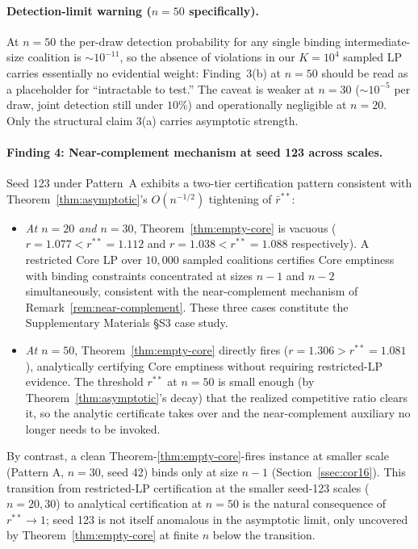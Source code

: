 \documentclass[11pt]{article}
\theoremstyle{plain}
\theoremstyle{definition}
\theoremstyle{remark}
\begin{document}
\paragraph{Detection-limit warning ($n=50$ specifically).} At $n=50$ the per-draw detection probability for any single binding intermediate-size coalition is $\sim 10^{-11}$, so the absence of violations in our $K=10^{4}$ sampled LP carries essentially no evidential weight: Finding~3(b) at $n=50$ should be read as a placeholder for ``intractable to test.'' The caveat is weaker at $n=30$ ($\sim 10^{-5}$ per draw, joint detection still under $10\%$) and operationally negligible at $n=20$. Only the structural claim 3(a) carries asymptotic strength.

\paragraph{Finding 4: Near-complement mechanism at seed 123 across scales.} Seed 123 under Pattern~A exhibits a two-tier certification pattern consistent with Theorem~\ref{thm:asymptotic}'s $O(n^{-1/2})$ tightening of $\bar r^{\ast\ast}$:
\begin{itemize}
  \item \emph{At $n=20$ and $n=30$}, Theorem~\ref{thm:empty-core} is vacuous ($r=1.077<r^{\ast\ast}=1.112$ and $r=1.038<r^{\ast\ast}=1.088$ respectively). A restricted Core LP over $10{,}000$ sampled coalitions certifies Core emptiness with binding constraints concentrated at sizes $n-1$ and $n-2$ simultaneously, consistent with the near-complement mechanism of Remark~\ref{rem:near-complement}. These three cases constitute the Supplementary Materials \S S3 case study.
  \item \emph{At $n=50$}, Theorem~\ref{thm:empty-core} directly fires ($r=1.306>r^{\ast\ast}=1.081$), analytically certifying Core emptiness without requiring restricted-LP evidence. The threshold $r^{\ast\ast}$ at $n=50$ is small enough (by Theorem~\ref{thm:asymptotic}'s decay) that the realized competitive ratio clears it, so the analytic certificate takes over and the near-complement auxiliary no longer needs to be invoked.
\end{itemize}
By contrast, a clean Theorem-\ref{thm:empty-core}-fires instance at smaller scale (Pattern A, $n=30$, seed 42) binds only at size $n-1$ (Section~\ref{ssec:cor16}). This transition from restricted-LP certification at the smaller seed-123 scales ($n=20,30$) to analytical certification at $n=50$ is the natural consequence of $r^{\ast\ast}\to 1$; seed 123 is not itself anomalous in the asymptotic limit, only uncovered by Theorem~\ref{thm:empty-core} at finite $n$ below the transition.
\end{document}
